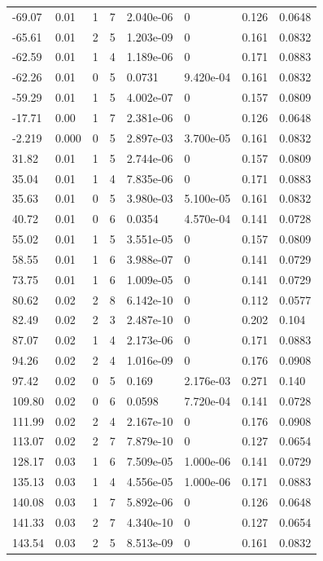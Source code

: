 \documentclass[preview]{standalone}
\begin{document}
{{\begin{tabular}{L{1.2cm}C{1.2cm} C{0.3cm}C{0.5cm} C{1.4cm}C{1.4cm} C{1.4cm}C{1.4cm}}
  -69.07  &  0.01  & 1     &  7 &  2.040e-06  & 0  & 0.126 &  0.0648   \\ 
  -65.61  &  0.01  & 2     &  5 &  1.203e-09  & 0  & 0.161 &  0.0832   \\ 
  -62.59  &  0.01  & 1     &  4 &  1.189e-06  & 0  & 0.171 &  0.0883   \\ 
  -62.26  &  0.01  & 0     &  5 &  0.0731  & 9.420e-04  & 0.161 &  0.0832   \\ 
  -59.29  &  0.01  & 1     &  5 &  4.002e-07  & 0  & 0.157 &  0.0809   \\ 
  -17.71  &  0.00  & 1     &  7 &  2.381e-06  & 0  & 0.126 &  0.0648   \\ 
  -2.219  &  0.000  & 0     &  5 &  2.897e-03  & 3.700e-05  & 0.161 &  0.0832   \\ 
  31.82  &  0.01  & 1     &  5 &  2.744e-06  & 0  & 0.157 &  0.0809   \\ 
  35.04  &  0.01  & 1     &  4 &  7.835e-06  & 0  & 0.171 &  0.0883   \\ 
  35.63  &  0.01  & 0     &  5 &  3.980e-03  & 5.100e-05  & 0.161 &  0.0832   \\ 
  40.72  &  0.01  & 0     &  6 &  0.0354  & 4.570e-04  & 0.141 &  0.0728   \\ 
  55.02  &  0.01  & 1     &  5 &  3.551e-05  & 0  & 0.157 &  0.0809   \\ 
  58.55  &  0.01  & 1     &  6 &  3.988e-07  & 0  & 0.141 &  0.0729   \\ 
  73.75  &  0.01  & 1     &  6 &  1.009e-05  & 0  & 0.141 &  0.0729   \\ 
  80.62  &  0.02  & 2     &  8 &  6.142e-10  & 0  & 0.112 &  0.0577   \\ 
  82.49  &  0.02  & 2     &  3 &  2.487e-10  & 0  & 0.202 &  0.104   \\ 
  87.07  &  0.02  & 1     &  4 &  2.173e-06  & 0  & 0.171 &  0.0883   \\ 
  94.26  &  0.02  & 2     &  4 &  1.016e-09  & 0  & 0.176 &  0.0908   \\ 
  97.42  &  0.02  & 0     &  5 &  0.169  & 2.176e-03  & 0.271 &  0.140   \\ 
  109.80  &  0.02  & 0     &  6 &  0.0598  & 7.720e-04  & 0.141 &  0.0728   \\ 
  111.99  &  0.02  & 2     &  4 &  2.167e-10  & 0  & 0.176 &  0.0908   \\ 
  113.07  &  0.02  & 2     &  7 &  7.879e-10  & 0  & 0.127 &  0.0654   \\ 
  128.17  &  0.03  & 1     &  6 &  7.509e-05  & 1.000e-06  & 0.141 &  0.0729   \\ 
  135.13  &  0.03  & 1     &  4 &  4.556e-05  & 1.000e-06  & 0.171 &  0.0883   \\ 
  140.08  &  0.03  & 1     &  7 &  5.892e-06  & 0  & 0.126 &  0.0648   \\ 
  141.33  &  0.03  & 2     &  7 &  4.340e-10  & 0  & 0.127 &  0.0654   \\ 
  143.54  &  0.03  & 2     &  5 &  8.513e-09  & 0  & 0.161 &  0.0832   \\ 
\hline 
\end{tabular} 

}}
\end{document}
